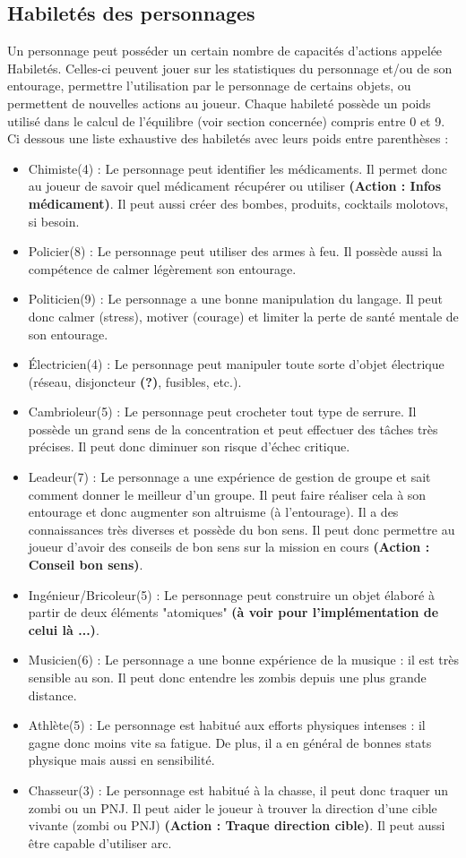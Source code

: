 \subsection{Habiletés des personnages}
Un personnage peut posséder un certain nombre de capacités d'actions appelée Habiletés. Celles-ci peuvent jouer sur les statistiques du personnage et/ou de son entourage, permettre l'utilisation par le personnage de certains objets, ou permettent de nouvelles actions au joueur. Chaque habileté possède un poids utilisé dans le calcul de l'équilibre (voir section concernée) compris entre 0 et 9. Ci dessous une liste exhaustive des habiletés avec leurs poids entre parenthèses :
\begin{itemize}
  \item Chimiste(4) : Le personnage peut identifier les médicaments. Il permet donc au joueur de savoir quel médicament récupérer ou utiliser \textbf{(Action : Infos médicament)}. Il peut aussi créer des bombes, produits, cocktails molotovs, si besoin.
  \item Policier(8) : Le personnage peut utiliser des armes à feu. Il possède aussi la compétence de calmer légèrement son entourage.
  \item Politicien(9) : Le personnage a une bonne manipulation du langage. Il peut donc calmer (stress), motiver (courage) et limiter la perte de santé mentale de son entourage.
  \item Électricien(4) : Le personnage peut manipuler toute sorte d'objet électrique (réseau, disjoncteur \textbf{(?)}, fusibles, etc.).
  \item Cambrioleur(5) : Le personnage peut crocheter tout type de serrure. Il possède un grand sens de la concentration et peut effectuer des tâches très précises. Il peut donc diminuer son risque d'échec critique.
  \item Leadeur(7) : Le personnage a une expérience de gestion de groupe et sait comment donner le meilleur d'un groupe. Il peut faire réaliser cela à son entourage et donc augmenter son altruisme (à l'entourage). Il a des connaissances très diverses et possède du bon sens. Il peut donc permettre au joueur d'avoir des conseils de bon sens sur la mission en cours \textbf{(Action : Conseil bon sens)}.
  \item Ingénieur/Bricoleur(5) : Le personnage peut construire un objet élaboré à partir de deux éléments "atomiques" \textbf{(à voir pour l'implémentation de celui là ...)}.
  \item Musicien(6) : Le personnage a une bonne expérience de la musique : il est très sensible au son. Il peut donc entendre les zombis depuis une plus grande distance.
  \item Athlète(5) : Le personnage est habitué aux efforts physiques intenses : il gagne donc moins vite sa fatigue. De plus, il a en général de bonnes stats physique mais aussi en sensibilité.
  \item Chasseur(3) : Le personnage est habitué à la chasse, il peut donc traquer un zombi ou un PNJ. Il peut  aider le joueur à trouver la direction d'une cible vivante (zombi ou PNJ) \textbf{(Action : Traque direction cible)}. Il peut aussi être capable d'utiliser arc.
\end{itemize}
